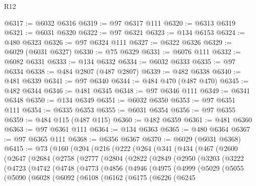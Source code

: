\begin{lexlean}{R12}
\begin{coremodule}
{{{{{{{{{{{{{{{{{{{{{{{{{{{{{{{{{{{{{{{{{{{{{{{{{{{{{{{{{{{{{{{{{{{{{{{{{{{{{{{{{{@6317 := @6032 @6316
@6319 := @97 @6317 @111
@6320 := @6313 @6319
@6321 := @6031 @6320
@6322 := @97 @6321
@6323 := @134 @6153
@6324 := @480 @6323
@6326 := @97 @6324 @111
@6327 := @6322 @6326
@6329 := @6029 (@6031 @6327)
@6330 := @75 @6329
@6331 := @6076 @111
@6332 := @6082 @6331
@6333 := @134 @6332
@6334 := @6032 @6333
@6335 := @97 @6334
@6338 := @484 @2807 (@487 @2807)
@6339 := @482 @6338
@6340 := @481 @6339
@6341 := @97 @6340
@6344 := @484 @470 (@487 @470)
@6345 := @482 @6344
@6346 := @481 @6345
@6348 := @97 @6346 @111
@6349 := @6341 @6348
@6350 := @134 @6349
@6351 := @6032 @6350
@6353 := @97 @6351 @111
@6354 := @6335 @6353
@6355 := @6031 @6354
@6356 := @97 @6355
@6359 := @484 @115 (@487 @115)
@6360 := @482 @6359
@6361 := @481 @6360
@6363 := @97 @6361 @111
@6364 := @134 @6363
@6365 := @480 @6364
@6367 := @97 @6365 @111
@6368 := @6356 @6367
@6370 := @6029 (@6031 @6368)
@6415 := @73
    (@160
      (@204
        (@216
          (@222
            (@264
              (@341
                (@434
                  (@467
                    (@2600
                      (@2647
                        (@2684
                          (@2758
                            (@2777
                              (@2804
                                (@2822
                                  (@2849
                                    (@2950
                                      (@3203
                                        (@3222
                                          (@4723
                                            (@4742
                                              (@4748
                                                (@4773
                                                  (@4856
                                                    (@4946
                                                      (@4975
                                                        (@4999
                                                          (@5029
                                                            (@5055
                                                              (@5090
                                                                (@6028
                                                                  (@6092
                                                                    (@6108
                                                                      (@6162
                                                                        (@6175
                                                                          (@6226
                                                                            (@6245
}}}}}}}}}}}}}}}}}}}}}}}}}}}}}}}}}}}}}}}}}}}}}}}}}}}}}}}}}}}}}}}}}}}}}}}}}}}}}}}}}}
\end{coremodule}
\end{lexlean}
